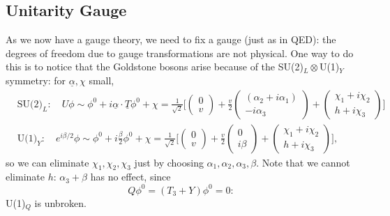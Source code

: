 \subsection{Unitarity Gauge}
%
As we now have a gauge theory, we need to fix a gauge (just as in QED): the degrees of freedom due to gauge transformations are not physical. One way to do this is to notice that the Goldstone bosons arise because of the SU(2)$_L \otimes$U(1)$_Y$ symmetry: for $\underline{\alpha}, \chi$ small, 
\begin{equation}
\begin{split}
&\text{SU(2)}_L: \quad U\phi \sim \phi^0 + i\underline{\alpha}\cdot \underline{T} \phi^0 + \chi = \frac{1}{\sqrt{2}} \bigg[ 
\begin{pmatrix}
0 \\ v
\end{pmatrix}
+ \frac{v}{2}
\begin{pmatrix}
(\alpha_2 + i \alpha_1) \\ -i\alpha_3
\end{pmatrix}
+ \begin{pmatrix}
\chi_1 + i \chi_2 \\ h + i \chi_3
\end{pmatrix} \bigg] \\
&\text{U(1)}_Y: \quad e^{i\beta /2}\phi \sim \phi^0 + i\frac{\beta}{2}\phi^0 + \chi = \frac{1}{\sqrt{2}} \bigg[ 
\begin{pmatrix}
0 \\ v
\end{pmatrix}
+ \frac{v}{2}
\begin{pmatrix}
0 \\ i\beta
\end{pmatrix}
+ \begin{pmatrix}
\chi_1 + i \chi_2 \\ h + i \chi_3
\end{pmatrix} \bigg],
\end{split}
\end{equation}
so we can eliminate $\chi_1, \chi_2, \chi_3$ just by choosing $\alpha_1, \alpha_2, \alpha_3, \beta$. Note that we cannot eliminate $h$: $\alpha_3 + \beta$ has no effect, since
\begin{equation}
Q \phi^0 = (T_3 + Y) \phi^0 = 0:
\end{equation}
U(1)$_Q$ is unbroken.


